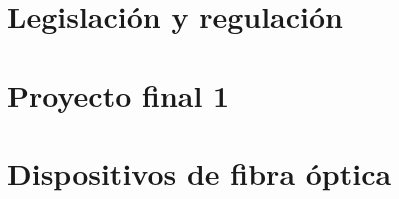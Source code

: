 \documentclass[12pt,fleqn,a4paper,oneside]{LegrandOrangeBook}
\begin{document}
\part{Legislación y regulación}

\part{Proyecto final 1}


\part{Dispositivos de fibra óptica}





\end{document}
